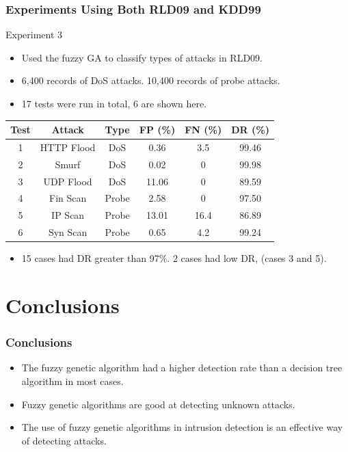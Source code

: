 \documentclass{beamer}
\begin{document}
\begin{frame}
	\frametitle{Experiments Using Both RLD09 and KDD99}
Experiment 3
	\begin{itemize}
		\item Used the fuzzy GA to classify types of attacks in RLD09.
		\item 6,400 records of DoS attacks. 10,400 records of probe attacks.
		\item 17 tests were run in total, 6 are shown here.
	\end{itemize}
\begin{table}
\begin{tabular}{cccccc}
Test & Attack & Type & FP (\%) & FN (\%) & DR (\%)\\ \hline
1 & HTTP Flood & DoS & 0.36 & 3.5 & 99.46\\
2 & Smurf & DoS & 0.02 & 0 & 99.98\\
3 & UDP Flood & DoS & 11.06 & 0 & 89.59\\
4 & Fin Scan & Probe & 2.58 & 0 & 97.50\\
5 & IP Scan & Probe & 13.01 & 16.4 & 86.89\\
6 & Syn Scan & Probe & 0.65 & 4.2 & 99.24\\
\end{tabular}
\end{table}

\begin{itemize}
	\item 15 cases had DR greater than 97\%. 2 cases had low DR, (cases 3 and 5).
\end{itemize}

\end{frame}
\section[Conclusions]{Conclusions}

\begin{frame}
\frametitle{Conclusions}
	\begin{itemize}
		\item The fuzzy genetic algorithm had a higher detection rate than a decision tree algorithm in most cases.
		\item Fuzzy genetic algorithms are good at detecting unknown attacks.
		\item The use of fuzzy genetic algorithms in intrusion detection is an effective way of detecting attacks.
	\end{itemize}
\end{frame}
\end{document}
